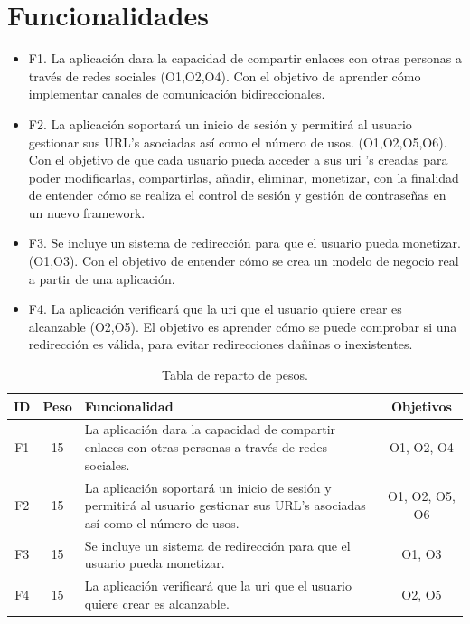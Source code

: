 \documentclass{article}
\begin{document}
\section*{Funcionalidades}
 
\begin{itemize}
    \item F1. La aplicación dara la capacidad de compartir enlaces con otras personas a través de redes sociales (O1,O2,O4). Con el objetivo de aprender cómo implementar canales de comunicación bidireccionales.
    \item F2. La aplicación soportará un inicio de sesión y permitirá al usuario gestionar sus URL's asociadas así como el número de usos. (O1,O2,O5,O6). Con el objetivo de que cada usuario pueda acceder a sus uri 's creadas para poder modificarlas, compartirlas, añadir, eliminar, monetizar, con la finalidad de entender cómo se realiza el control de sesión y gestión de contraseñas en un nuevo framework.
    \item F3. Se incluye un sistema de redirección para que el usuario pueda monetizar. (O1,O3). Con el objetivo de entender cómo se crea un modelo de negocio real a partir de una aplicación.
    \item F4. La aplicación verificará que la uri que el usuario quiere crear es alcanzable (O2,O5). El objetivo es aprender cómo se puede comprobar si una redirección es válida, para evitar redirecciones dañinas o inexistentes.
\end{itemize}
 
\begin{table}[hbtp]
    \footnotesize
    \centering
    \settowidth{}
    \setlength\extrarowheight{5pt}
    \begin{tabulary}{\textwidth}{ C C L C}
        \textbf{ID} & 
        \textbf{Peso} & 
        \textbf{Funcionalidad} & 
        \textbf{Objetivos}\\
    \hline
    \hline
        F1 & 
        15 & 
        La aplicación dara la capacidad de compartir enlaces con otras personas a través de redes sociales. &
        O1, O2, O4\\
    \hline  
        F2 &
        15 &
        La aplicación soportará un inicio de sesión y permitirá al usuario gestionar sus URL's asociadas así como el número de usos. &
        O1, O2, O5, O6\\
    \hline
        F3 &
        15 &
        Se incluye un sistema de redirección para que el usuario pueda monetizar. &
        O1, O3\\
    \hline
        F4 &
        15 &
        La aplicación verificará que la uri que el usuario quiere crear es alcanzable. &
        O2, O5
 
    \end{tabulary}
    \caption{Tabla de reparto de pesos.}
\end{table}
 
\end{document}
